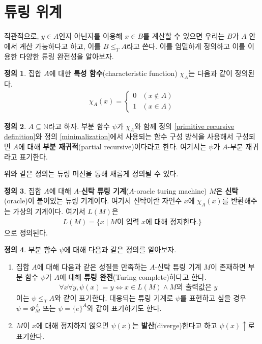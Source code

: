 \documentclass[b5paper, 11pt]{book}
\theoremstyle{definition}
\newtheorem{defn}{정의}[chapter]
\begin{document}
\section{튜링 위계}
직관적으로, $y \in A$인지 아닌지를 이용해 $x \in B$를 계산할 수 있으면 우리는 $B$가 $A$ 안에서 계산 가능하다고 하고, 이를 $B \le_T A$라고 쓴다. 이를 엄밀하게 정의하고 이를 이용한 다양한 튜링 완전성을 알아보자.
\begin{defn}
    집합 $A$에 대한 \textbf{특성 함수}(characteristic function) $\chi_A$는 다음과 같이 정의된다.
    \begin{align*}
        \chi_A(x) = 
        \begin{cases}
            0 & (x \notin A) \\ 
            1 & (x \in A)
        \end{cases}
    \end{align*}
\end{defn}
\begin{defn}
    $A \subseteq \mathbb{N}$라고 하자. 부분 함수 $\psi$가 
    $\chi_A$와 함께 정의 \ref{primitive recursive definition}와 정의 \ref{minimalization}에서 사용되는 함수 구성 방식을 사용해서 구성되면 $A$에 대해 \textbf{부분 재귀적}(partial recursive)이다라고 한다. 여기서는 $\psi$가 $A$-부분 재귀라고 표기한다.
\end{defn}
위와 같은 정의는 튜링 머신을 통해 새롭게 정의될 수 있다.
\begin{defn}
    집합 $A$에 대해 $A$-\textbf{신탁 튜링 기계}($A$-oracle turing machine) $M$은 \textbf{신탁}(oracle)이 붙어있는 튜링 기계이다. 여기서 신탁이란 자연수 $x$에 $\chi_A(x)$를 반환해주는 가상의 기계이다. 여기서 $L(M)$은 
    \begin{align*}
        L(M) = \{x \;\vert\; M\text{이 입력 } x\text{에 대해 정지한다.} \}
    \end{align*}
    으로 정의된다.
\end{defn}
\begin{defn}
    부분 함수 $\psi$에 대해 다음과 같은 정의를 알아보자.
    \begin{enumerate}
        \item 집합 $A$에 대해 다음과 같은 성질을 만족하는 $A$-신탁 튜링 기계 $M$이 존재하면 부분 함수 $\psi$가 $A$에 대해 \textbf{튜링 완전}(Turing complete)하다고 한다.
        \begin{align*}
            \forall x \forall y,  \psi(x) = y \Leftrightarrow 
            x \in L(M) \wedge M\text{의 출력값은 } y
        \end{align*} 
        이는 $\psi \le_T A$와 같이 표기한다. 대응되는 튜링 기계로 $\psi$를 표현하고 싶을 경우 $\psi = \Phi_M^A$ 또는 $\psi = \{e\}^A$와 같이 표기하기도 한다. 
        \item $M$이 $x$에 대해 정지하지 않으면 $\psi(x)$는 \textbf{발산}(diverge)한다고 하고
        $\psi(x) \uparrow$로 표기한다.
    \end{enumerate}
\end{defn}
\end{document}
